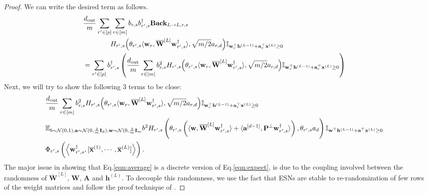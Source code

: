 \begin{claim}
			\begin{proof}
				We can write the desired term as follows.
				\begin{align*}
					&\frac{d_{\mathrm{out}} }{m}    \sum_{r' \in [p]} \sum_{r \in [m]}  b_{r, s} b_{r', s}^{\dagger} \mathbf{Back}_{L \to L, r, s} \\& \quad \quad \quad \quad H_{r', s}\Big(\theta_{r', s} \langle \mathbf{w}_{r}, \overline{\mathbf{W}}^{[L]} \mathbf{w}_{r', s}^{\dagger}\rangle, \sqrt{m/2} a_{r, d}\Big) \mathbb{I}_{\mathbf{w}_r^{\top} \mathbf{h}^{(L-1)} + \mathbf{a}_r^{\top} \mathbf{x}^{(L)} \ge 0} \\
					&= \sum_{r' \in [p]} b_{r', s}^{\dagger} \left(\frac{d_{\mathrm{out}} }{m} \sum_{r \in [m]} b_{r, s}^2 H_{r', s}\Big(\theta_{r', s} \langle \mathbf{w}_{r}, \overline{\mathbf{W}}^{[L]} \mathbf{w}_{r', s}^{\dagger}\rangle, \sqrt{m/2} a_{r, d}\Big) \mathbb{I}_{\mathbf{w}_r^{\top} \mathbf{h}^{(L-1)} + \mathbf{a}_r^{\top} \mathbf{x}^{(L)} \ge 0} \right) 
				\end{align*}
				Next, we will try to show the following 3 terms to be close:
				\begin{align}
					&\frac{d_{\mathrm{out}} }{m} \sum_{r \in [m]} b_{r, s}^2 H_{r', s}\Big(\theta_{r', s} \langle \mathbf{w}_{r}, \overline{\mathbf{W}}^{[L]} \mathbf{w}_{r', s}^{\dagger}\rangle, \sqrt{m/2} a_{r, d}\Big) \mathbb{I}_{\mathbf{w}_r^{\top} \mathbf{h}^{(L-1)} + \mathbf{a}_r^{\top} \mathbf{x}^{(L)} \ge 0} \label{eqn:average}\\
					& \mathbb{E}_{b \sim \mathcal{N}(0, 1), \mathbf{a} \sim \mathcal{N}(0, \frac{2}{m}\mathbf{I}_{d}), \mathbf{w} \sim \mathcal{N}(0, \frac{2}{m}\mathbf{I}_{m}} b^2 H_{r', s}\left(\theta_{r', s} \left(\langle \mathbf{w}, \overline{\mathbf{W}}^{[L]} \mathbf{w}_{r', s}^{\dagger}\rangle + \langle \mathbf{a}^{[d-1]},  \mathbf{P}^{\perp}\mathbf{w}_{r', s}^{\dagger}  \rangle\right), \theta_{r', s} a_d\right) \mathbb{I}_{\mathbf{w}^{\top} \mathbf{h}^{(L-1)} + \mathbf{a}^{\top} \mathbf{x}^{(L)} \ge 0} \label{eqn:expect}
					\\& 
					\Phi_{r', s} \left(\left\langle \mathbf{w}_{r', s}^{\dagger}, [\overline{\mathbf{x}}^{(1)}, \cdots, \overline{\mathbf{x}}^{(L)}]\right\rangle\right). \label{eqn:Phi}
				\end{align}
				The major issue in showing that Eq.\ref{eqn:average} is a discrete version of Eq.\ref{eqn:expect}, is due to the coupling involved between the randomness of $\overline{\mathbf{W}}^{[L]}$, $\mathbf{W}$, $\mathbf{A}$ and $\mathbf{h}^{(L)}$.  To decouple this randomness, we use the fact that ESNs are stable to re-randomization of few rows of the weight matrices and follow the proof technique of \cite[Lemma G.3]{allen2019can}. 
				

\end{proof}
\end{claim}
